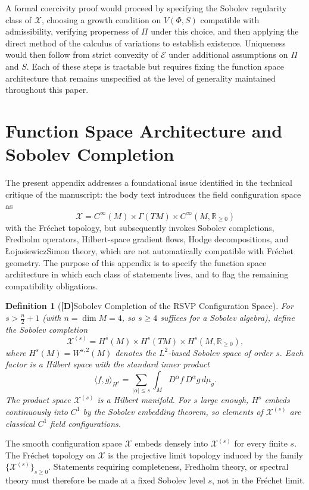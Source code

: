 \documentclass[12pt,a4paper]{article}
\newcommand{\claimD}{\textbf{[D]}\;}
\newtheorem{defn}{Definition}[section]
\newcommand{\Field}{\mathcal{X}}
\begin{document}
A formal coercivity proof would proceed by specifying the Sobolev regularity
class of $\Field$, choosing a growth condition on $V(\Phi,S)$ compatible with
admissibility, verifying properness of $\Pi$ under this choice, and then
applying the direct method of the calculus of variations to establish existence.
Uniqueness would then follow from strict convexity of $\mathcal{E}$ under
additional assumptions on $\Pi$ and $S$. Each of these steps is tractable but
requires fixing the function space architecture that remains unspecified at the
level of generality maintained throughout this paper.

\section{Function Space Architecture and Sobolev Completion}

The present appendix addresses a foundational issue identified in the technical
critique of the manuscript: the body text introduces the field configuration
space as
\[
\Field = C^\infty(M)\times\Gamma(TM)\times C^\infty(M,\mathbb{R}_{\geq 0})
\]
with the Fr\'{e}chet topology, but subsequently invokes Sobolev completions,
Fredholm operators, Hilbert-space gradient flows, Hodge decompositions, and
Łojasiewicz\discretionary{-}{-}{--}Simon theory, which are not automatically compatible with
Fr\'{e}chet geometry. The purpose of this appendix is to specify the function
space architecture in which each class of statements lives, and to flag
the remaining compatibility obligations.

\begin{defn}[\claimD Sobolev Completion of the RSVP Configuration Space]
For $s>\frac{n}{2}+1$ (with $n=\dim M=4$, so $s\geq 4$ suffices for a Sobolev
algebra), define the Sobolev completion
\[
\Field^{(s)}
= H^s(M)\times H^s(TM)\times H^s(M,\mathbb{R}_{\geq 0}),
\]
where $H^s(M)=W^{s,2}(M)$ denotes the $L^2$-based Sobolev space of
order $s$. Each factor is a Hilbert space with the standard inner product
\[
\langle f,g\rangle_{H^s}
= \sum_{|\alpha|\leq s}\int_M D^\alpha f\,D^\alpha g\,d\mu_g.
\]
The product space $\Field^{(s)}$ is a Hilbert manifold. For $s$ large enough,
$H^s$ embeds continuously into $C^1$ by the Sobolev embedding theorem, so
elements of $\Field^{(s)}$ are classical $C^1$ field configurations.
\end{defn}

The smooth configuration space $\Field$ embeds densely into $\Field^{(s)}$ for
every finite $s$. The Fr\'{e}chet topology on $\Field$ is the projective limit
topology induced by the family $\{\Field^{(s)}\}_{s\geq 0}$. Statements
requiring completeness, Fredholm theory, or spectral theory must therefore be
made at a fixed Sobolev level $s$, not in the Fr\'{e}chet limit.
\end{document}
